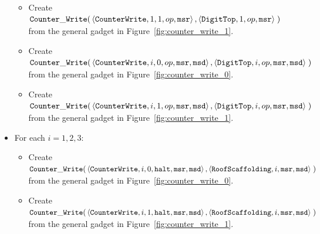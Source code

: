 \begin{itemize}
\begin{itemize}
        \item Create
        $\begin{aligned}[t]
            {\tt Counter\_Write}(& \left\langle {\tt CounterWrite}, 1, 1, op, {\tt msr} \right\rangle,
                      \left\langle {\tt DigitTop},     1,    op, {\tt msr} \right\rangle \;)
        \end{aligned}$ \\ from the general gadget in Figure~\ref{fig:counter_write_1}.

        \item Create
        $\begin{aligned}[t]
            {\tt Counter\_Write}(& \left\langle {\tt CounterWrite}, i, 0, op, {\tt msr}, {\tt msd} \right\rangle,
                      \left\langle {\tt DigitTop},     i,    op, {\tt msr}, {\tt msd} \right\rangle \;)
        \end{aligned}$ \\ from the general gadget in Figure~\ref{fig:counter_write_0}.

        \item Create
        $\begin{aligned}[t]
            {\tt Counter\_Write}(& \left\langle {\tt CounterWrite}, i, 1, op, {\tt msr}, {\tt msd} \right\rangle,
                      \left\langle {\tt DigitTop},     i,    op, {\tt msr}, {\tt msd} \right\rangle \;)
        \end{aligned}$ \\ from the general gadget in Figure~\ref{fig:counter_write_1}.
    \end{itemize}

    \item For each $i=1,2,3$:
    \begin{itemize}
        \item Create
        $\begin{aligned}[t]
            {\tt Counter\_Write}(& \left\langle {\tt CounterWrite},    i, 0, {\tt halt}, {\tt msr}, {\tt msd} \right\rangle,
                      \left\langle {\tt RoofScaffolding}, i,                {\tt msr}, {\tt msd} \right\rangle \;)
        \end{aligned}$ \\ from the general gadget in Figure~\ref{fig:counter_write_0}.

        \item Create
        $\begin{aligned}[t]
            {\tt Counter\_Write}(& \left\langle {\tt CounterWrite},    i, 1, {\tt halt}, {\tt msr}, {\tt msd} \right\rangle,
                      \left\langle {\tt RoofScaffolding}, i,                {\tt msr}, {\tt msd} \right\rangle \;)
        \end{aligned}$ \\ from the general gadget in Figure~\ref{fig:counter_write_1}.
    \end{itemize}

\end{itemize}

